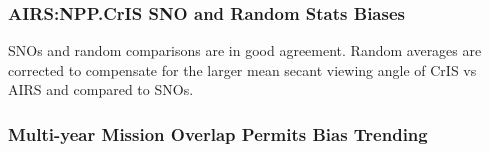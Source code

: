 \documentclass[10pt,t]{beamer}
\begin{document}
\begin{frame}
  \frametitle{AIRS:NPP.CrIS SNO and Random Stats Biases}
  \begin{figure}
    \centering
    \qquad
  \end{figure}

  \small
  SNOs and random comparisons are in good agreement. Random averages are corrected to compensate for the larger mean secant viewing angle of CrIS vs AIRS and compared to SNOs.
\end{frame}
\begin{frame}
  \frametitle{Multi-year Mission Overlap Permits Bias Trending}
  \begin{figure}[]
    
    \end{figure}
    
\end{frame}
\end{document}
